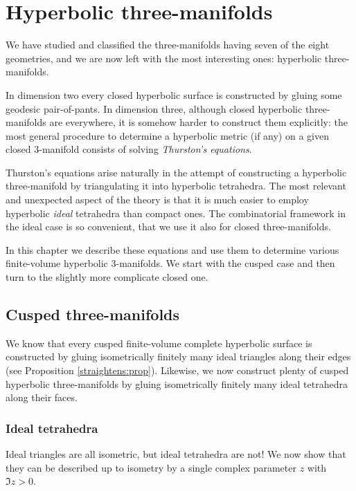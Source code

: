 \chapter{Hyperbolic three-manifolds} \label{three:chapter}

We have studied and classified the three-manifolds having seven of the eight geometries, and we are now left with the most interesting ones: hyperbolic three-manifolds.

In dimension two every closed hyperbolic surface is constructed by gluing some geodesic pair-of-pants. In dimension three, although closed hyperbolic three-manifolds are everywhere, it is somehow harder to construct them explicitly: the most general procedure to determine a hyperbolic metric (if any) on a given closed 3-manifold consists of solving \emph{Thurston's equations}.

Thurston's equations arise naturally in the attempt of constructing a hyperbolic three-manifold by triangulating it into hyperbolic tetrahedra. 
The most relevant and unexpected aspect of the theory is that it is much easier to employ hyperbolic \emph{ideal} tetrahedra than compact ones. The combinatorial framework in the ideal case is so convenient, that we use it also for closed three-manifolds.

In this chapter we describe these equations and use them to determine various finite-volume hyperbolic 3-manifolds. We start with the cusped case and then turn to the slightly more complicate closed one.

\section{Cusped three-manifolds} \label{cusped:section}
We know that every cusped finite-volume complete hyperbolic surface is constructed by gluing isometrically finitely many ideal triangles along their edges (see Proposition \ref{straightens:prop}). Likewise, we now construct plenty of cusped hyperbolic three-manifolds by gluing isometrically finitely many ideal tetrahedra along their faces.

\subsection{Ideal tetrahedra}
Ideal triangles are all isometric, but ideal tetrahedra are not! We now show that they can be described up to isometry by a single complex parameter $z$ with $\Im z >0$.


